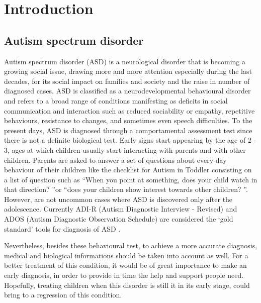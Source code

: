 \documentclass[11pt]{report}
\begin{document}


\chapter{Introduction}\label{chap:introduction}
\section{Autism spectrum disorder} \label{chap:autism}
Autism spectrum disorder (ASD) is a neurological disorder that is becoming a growing social issue, drawing more and more attention especially during the last decades, for its social impact on families and society and the raise in number of diagnosed cases.
ASD is classified as a neurodevelopmental behavioural disorder \cite{guze-1995} \cite{who-1993} and refers to a broad range of conditions manifesting as deficits in social communication and interaction such as reduced sociability or empathy, repetitive behaviours, resistance to changes, and sometimes even speech difficulties.\cite{rapin-2008}
To the present days, ASD is diagnosed through a comportamental assessment test since there is not a definite biological test.
Early signs start appearing by the age of 2 - 3, ages at which children usually start interacting with parents and with other children.
Parents are asked to answer a set of questions about every-day behaviour of their children like the checklist for Autism in Toddler \cite{robins-2009} consisting on a list of question such as \textquotedblleft When you point at something, does your child watch in that direction? \textquotedblright or \textquotedblleft does your children show interest towards other children? \textquotedblright.
However, are not uncommon cases where ASD is discovered only after the adolescence.
Currently ADI-R (Autism Diagnostic Interview - Revised) and ADOS (Autism Diagnostic Observation Schedule) are considered the ‘gold standard’ tools for diagnosis of ASD \cite{ozonoff-2015} \cite{lecouteur-2008}.

Nevertheless, besides these behavioural test, to achieve a more accurate diagnosis, medical and biological informations should be taken into account as well.
For a better treatment of this condition, it would be of great importance to make an early diagnosis, in order to provide in time the help and support people need.
Hopefully, treating children when this disorder is still it in its early stage, could bring to a regression of this condition.
\end{document}
